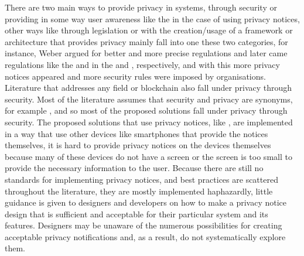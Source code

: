There are two main ways to provide privacy in \hyperlink{\acronym}{\acronym} systems, through security
or providing in some way user awareness like the in the case of using privacy
notices, other ways like through legislation or with the
creation/usage of a framework or architecture that provides privacy mainly
fall into one these two categories, for instance, Weber \cite{WEBER2015618} argued
for better and more precise regulations and later came regulations like the \hyperlink{\acronym}{\acronym} and \hyperlink{\acronym}{\acronym} in
the \hyperlink{\acronym}{\acronym} and \hyperlink{\acronym}{\acronym}, respectively, and with this more privacy notices appeared and
more security rules were imposed by organisations. Literature that addresses
any \hyperlink{\acronym}{\acronym} field \cite{zhao2020local, AntunesFederated, zhang2017privacy} or
blockchain \cite{AliIoT} also fall under privacy through security.
Most of the literature assumes that security and privacy are
synonyms, for example \cite{opara2022framework, FabianoInternet, SunSecure},
and so most of the proposed solutions fall under privacy through security.
The proposed solutions that use privacy notices, like \cite{FengDesign},
are implemented in a way that use other devices like smartphones that provide
the notices themselves, it is hard to provide privacy notices on the \hyperlink{\acronym}{\acronym}
devices themselves because many of these devices do not have a screen or
the screen is too small to provide the necessary information to the user.
Because there are still no standards for implementing privacy notices, and
best practices are scattered throughout the literature, they are mostly
implemented haphazardly, little guidance is given to designers and developers
on how to make a privacy notice design that is sufficient and acceptable
for their particular system and its features. Designers may be unaware of
the numerous possibilities for creating acceptable privacy notifications
and, as a result, do not systematically explore them.

